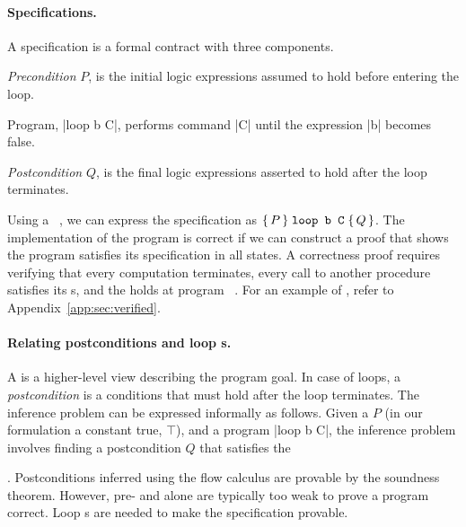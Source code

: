 \paragraph*{Specifications.}
A {specification} is a formal contract with three
components.
\begin{enumerate*}

    \item \emph{Precondition} \(P\), is the initial logic
expressions assumed to hold before entering the loop.

\item Program, \pr|loop b C|, performs command \pr|C| until the expression
\pr|b| becomes false.

\item \emph{Postcondition} \(Q\), is the final logic
expressions asserted to hold after the loop terminates.

\end{enumerate*}

Using a ~\cite{hoare1969}, we can express the specification as
\(\Hoare{P}{\prm{loop b C}}{Q}\). The implementation of the program is correct
if we can construct a proof that shows the program satisfies its specification
in all states. A correctness proof requires verifying that every computation
terminates, every call to another procedure satisfies its
s, and the  holds at program
~\cite{furia2010}. For an example of ,
refer to Appendix~\ref{app:sec:verified}.

\paragraph*{Relating postconditions and loop s.}
A  is a higher-level view describing the program goal. In
case of loops, a \emph{postcondition} is a conditions that must hold after the
loop terminates. The  inference problem
can be expressed informally as follows. Given a 
\(P\) (in our formulation a constant true, \(\top\)),
and a program \pr|loop b C|, the inference problem involves finding a
postcondition \(Q\) that satisfies the 
\begin{prooftree} %
\end{prooftree}.
Postconditions inferred using the flow calculus are provable
by the soundness theorem. However, pre- and
 alone are typically too weak to prove a program correct.
Loop s are needed to make the specification
provable.

